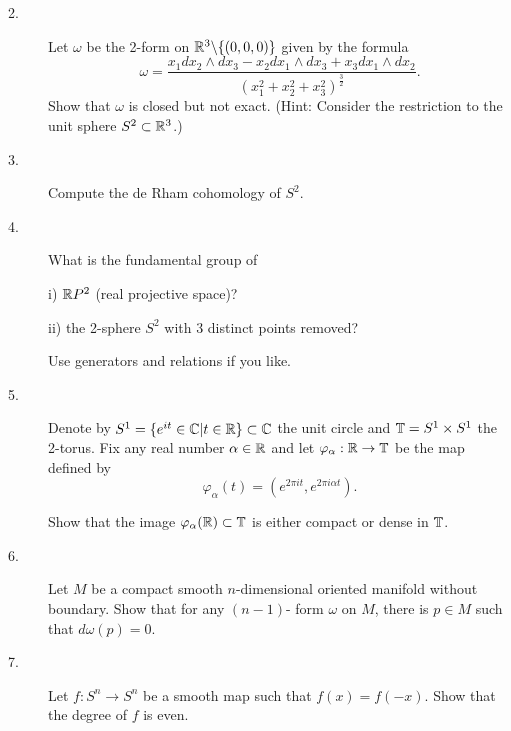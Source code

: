 \documentclass{article}
\begin{document}
\begin{description}
\item[2.]
Let $\omega$ be the 2-form on $\Bbb R^3 \backslash \{(0,0,0)\}$ given by
the formula
$$\omega = \frac{x_1 dx_2 \wedge dx_3 - x_2dx_1 \wedge dx_3 + x_3dx_1
   \wedge dx_2}{(x^2_1 + x^2_2 + x^2_3)^{\frac{3}{2}}}.$$
Show that $\omega$ is closed but not exact. (Hint: Consider the restriction
to the unit sphere $S^2 \subset \Bbb R^3$.)

\item[3.]
Compute the de Rham cohomology of $S^2$.

\item[4.]
What is the fundamental group of

\item[\quad] i)
$\Bbb R P^2$ (real projective space)?

\item[\quad] ii)
the 2-sphere $S^2$ with 3 distinct points removed?

Use generators and relations if you like.

\item[5.]
Denote by $S^1 = \{e^{it} \in \Bbb C | t \in \Bbb R\} \subset \Bbb C$
the unit circle and $\Bbb T = S^1 \times S^1$ the 2-torus. Fix any real
number $\alpha \in \Bbb R$ and let $\varphi_\alpha : \Bbb R \to \Bbb T$ be
the map defined by
$$\varphi_\alpha (t) = (e^{2\pi it}, e^{2 \pi i \alpha t}).$$

Show that the image $\varphi_\alpha (\Bbb R) \subset \Bbb T$ is either compact
or dense in $\Bbb T$.

\item[6.]
Let $M$ be a compact smooth $n$-dimensional oriented manifold without
boundary. Show that for any $(n-1)$- form $\omega$ on $M$, there is
$p \in M$ such that $d\omega(p) = 0$.

\item[7.]
Let $f:S^n \to S^n$ be a smooth map such that $f(x) = f(-x)$. Show that the
degree of $f$ is even.




\end{description}    
\end{document}
